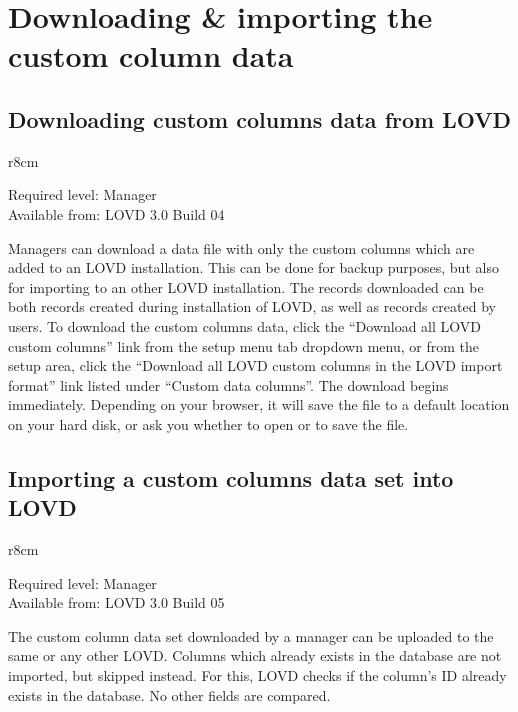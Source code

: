 \hypertarget{sec:download_import_custom_column_data}{}
\section{Downloading \& importing the custom column data}



\hypertarget{ssec:download_custom_columns_data}{}
\subsection{Downloading custom columns data from LOVD}
\begin{wrapfigure}[3]{r}{8cm} %
  \vspace{-25pt}
  \begin{leftbar}
    Required level: Manager\\
    Available from: LOVD 3.0 Build 04
  \end{leftbar}
\end{wrapfigure}
Managers can download a data file with only the custom columns which are added to an LOVD installation.
This can be done for backup purposes, but also for importing to an other LOVD installation.
The records downloaded can be both records created during installation of LOVD, as well as records created by users.
To download the custom columns data, click the ``Download all LOVD custom columns'' link from the setup menu
 tab dropdown menu, or from the setup area, click the ``Download all LOVD custom columns in the LOVD import
 format'' link listed under ``Custom data columns''.
The download begins immediately.
Depending on your browser, it will save the file to a default location on your hard disk, or ask you whether
 to open or to save the file.



\hypertarget{ssec:import_custom_columns_data}{}
\subsection{Importing a custom columns data set into LOVD}
\begin{wrapfigure}[3]{r}{8cm} %
  \vspace{-25pt}
  \begin{leftbar}
    Required level: Manager\\
    Available from: LOVD 3.0 Build 05
  \end{leftbar}
\end{wrapfigure}
The custom column data set downloaded by a manager can be uploaded to the same or any other LOVD.
Columns which already exists in the database are not imported, but skipped instead.
For this, LOVD checks if the column's ID already exists in the database.
No other fields are compared.





